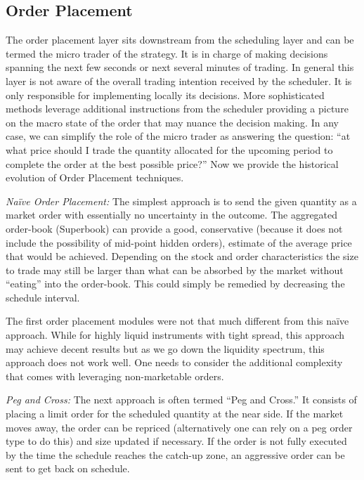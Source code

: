 \subsection{Order Placement\label{sec:order_placement}}

The order placement layer sits downstream from the scheduling layer and can be termed the micro trader of the strategy. It is in charge of making decisions spanning the next few seconds or next several minutes of trading. In general this layer is not aware of the overall trading intention received by the scheduler. It is only responsible for implementing locally its decisions. More sophisticated methods leverage additional instructions from the scheduler providing a picture on the macro state of the order that may nuance the decision making. In any case, we can simplify the role of the micro trader as answering the question: ``at what price should I trade the quantity allocated for the upcoming period to complete the order at the best possible price?'' Now we provide the historical evolution of Order Placement techniques. \twomedskip


\noindent\emph{Na\"ive Order Placement:} The simplest approach is to send the given quantity as a market order with essentially no uncertainty in the outcome. The aggregated order-book (Superbook) can provide a good, conservative (because it does not include the possibility of mid-point hidden orders), estimate of the average price that would be achieved. Depending on the stock and order characteristics the size to trade may still be larger than what can be absorbed by the market without ``eating'' into the order-book. This could simply be remedied by decreasing the schedule interval.


The first order placement modules were not that much different from this na\"ive approach. While for highly liquid instruments with tight spread, this approach may achieve decent results but as we go down the liquidity spectrum, this approach does not work well. One needs to consider the additional complexity that comes with leveraging non-marketable orders. \twomedskip


\noindent\emph{Peg and Cross:} The next approach is often termed ``Peg and Cross.'' It consists of placing a limit order  for the scheduled quantity at the near side. If the market moves away, the order can be repriced (alternatively one can rely on a peg order type to do this) and size updated if necessary. If the order is not fully executed by the time the schedule reaches the catch-up zone, an aggressive order can be sent to get back on schedule.


